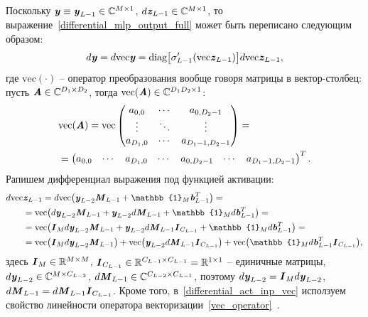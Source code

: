 Поскольку $\textbf{\textit{y}}\equiv\textbf{\textit{y}}_{L-1}\in\mathbb{C}^{M\times 1}$, $d\textbf{\textit{z}}_{L-1}\in\mathbb{C}^{M\times1}$, то выражение~\eqref{differential_mlp_output_full} может быть переписано следующим образом:
\begin{equation}
	d\textbf{\textit{y}}=d\text{vec}\textbf{\textit{y}}=\text{diag}\big[\sigma'_{L-1}(\text{vec}\textbf{\textit{z}}_{L-1})\big]d\text{vec}\textbf{\textit{z}}_{L-1},
	\label{differential_mlp_output_full_vec}
\end{equation}
где $\text{vec}(\cdot)$ -- оператор преобразования вообще говоря матрицы в вектор-столбец: пусть $\textbf{\textit{A}}\in\mathbb{C}^{D_1\times D_2}$, тогда $\text{vec}(\textbf{\textit{A}})\in\mathbb{C}^{D_1D_2\times1}$:
\begin{align}
	&\text{vec}(\textbf{\textit{A}})=\text{vec}\begin{pmatrix}
		a_{0, 0} & \cdots & a_{0, D_2 - 1} \\
		\vdots & \ddots & \vdots \\
		a_{D_1, 0} & \cdots & a_{D_1 - 1, D_2 - 1} \\ 
	\end{pmatrix}=\nonumber \\
	&=\begin{pmatrix}
		a_{0, 0} & \cdots & a_{D_1, 0} & \cdots & a_{0, D_2 - 1} & \cdots & a_{D_1 - 1, D_2 - 1}
	\end{pmatrix}^T.
	\label{vec_operator}
\end{align}
Рапишем дифференциал выражения под функцией активации:
\begin{align}
	d\text{vec}&\bit{z}_{L-1}=d\text{vec}\big(\bit{y}_{L-2}\bit{M}_{L-1}+\mathbb{1}_M\bit{b}_{L-1}^T\big)= \nonumber \\
	&=\text{vec}\big(d\bit{y}_{L-2}\bit{M}_{L-1}+\bit{y}_{L-2}d\bit{M}_{L-1}+\mathbb{1}_Md\bit{b}_{L-1}^T\big)= \nonumber \\
	&=\text{vec}\big(\bit{I}_{M}d\bit{y}_{L-2}\bit{M}_{L-1}+\bit{y}_{L-2}d\bit{M}_{L-1}\bit{I}_{C_{L-1}}+\mathbb{1}_Md\bit{b}_{L-1}^T\big)= \nonumber \\
	&=\text{vec}\big(\bit{I}_{M}d\bit{y}_{L-2}\bit{M}_{L-1}\big)+
	\text{vec}\big(\bit{y}_{L-2}d\bit{M}_{L-1}\bit{I}_{C_{L-1}}\big)+
	\text{vec}\big(\mathbb{1}_Md\bit{b}_{L-1}^T\bit{I}_{C_{L-1}}\big),
	\label{differential_act_inp_vec}
\end{align}
здесь $\textbf{\textit{I}}_{M}\in\mathbb{R}^{M\times M}$, $\textbf{\textit{I}}_{C_{L-1}}\in\mathbb{R}^{C_{L-1}\times C_{L-1}}=\mathbb{R}^{1\times 1}$ -- единичные матрицы, $d\textbf{\textit{y}}_{L-2}\in\mathbb{C}^{M\times C_{L-2}}$, $d\textbf{\textit{M}}_{L-1}\in\mathbb{C}^{C_{L-2}\times C_{L-1}}$, поэтому $d\textbf{\textit{y}}_{L-2}=\textbf{\textit{I}}_{M}d\textbf{\textit{y}}_{L-2}$, $d\textbf{\textit{M}}_{L-1}=d\textbf{\textit{M}}_{L-1}\textbf{\textit{I}}_{C_{L-1}}$. Кроме того, в~\eqref{differential_act_inp_vec} исползуем свойство линейности оператора векторизации~\eqref{vec_operator}~\cite{wirt_deriv_book}. 

